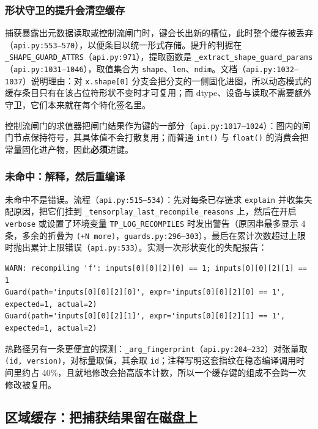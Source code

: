 \subsubsection{形状守卫的提升会清空缓存}

捕获暴露出元数据读取或控制流闸门时，键会长出新的槽位，此时整个缓存被丢弃（\texttt{api.py:553--570}），以便条目以统一形式存储。提升的判据在 \texttt{\_SHAPE\_GUARD\_ATTRS}（\texttt{api.py:971}），提取函数是 \texttt{\_extract\_shape\_guard\_params}（\texttt{api.py:1031--1046}），取值集合为 \texttt{shape}、\texttt{len}、\texttt{ndim}。文档（\texttt{api.py:1032--1037}）说明理由：对 \texttt{x.shape[0]} 分支会把分支的一侧固化进图，所以动态模式的缓存条目只有在该占位符形状不变时才可复用；而 dtype、设备与读取不需要额外守卫，它们本来就在每个特化签名里。

控制流闸门的求值器把闸门结果作为键的一部分（\texttt{api.py:1017--1024}）：图内的闸门节点保持符号，其具体值不会打散复用；而普通 \texttt{int()} 与 \texttt{float()} 的消费会把常量固化进产物，因此\textbf{必须}进键。

\subsubsection{未命中：解释，然后重编译}

未命中不是错误。流程（\texttt{api.py:515--534}）：先对每条已存链求 \texttt{explain} 并收集失配原因，把它们挂到 \texttt{\_tensorplay\_last\_recompile\_reasons} 上，然后在开启 \texttt{verbose} 或设置了环境变量 \texttt{TP\_LOG\_RECOMPILES} 时发出警告（原因串最多显示 4 条，多余的折叠为 \texttt{(+N more)}，\texttt{guards.py:296--303}），最后在累计次数超过上限时抛出累计上限错误（\texttt{api.py:533}）。实测一次形状变化的失配报告：

\begin{lstlisting}[caption={实测重编译原因。}, label=lst:fe:recompile, style=pystyle]
WARN: recompiling 'f': inputs[0][0][2][0] == 1; inputs[0][0][2][1] == 1
Guard(path='inputs[0][0][2][0]', expr='inputs[0][0][2][0] == 1', expected=1, actual=2)
Guard(path='inputs[0][0][2][1]', expr='inputs[0][0][2][1] == 1', expected=1, actual=2)
\end{lstlisting}

热路径另有一条更便宜的探测：\texttt{\_arg\_fingerprint}（\texttt{api.py:204--232}）对张量取 \texttt{(id, version)}，对标量取值，其余取 \texttt{id}；注释写明这套指纹在稳态编译调用时间里约占 40\%，且就地修改会抬高版本计数，所以一个缓存键的组成不会跨一次修改被复用。

\subsection{区域缓存：把捕获结果留在磁盘上}

